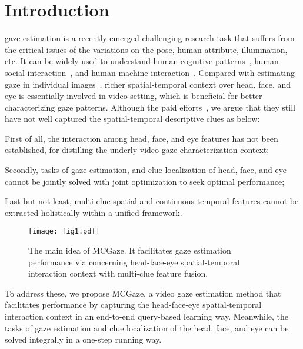 \documentclass[journal]{IEEEtran}
\begin{document}
\section{Introduction}
 gaze estimation is a recently emerged challenging research task that suffers from the critical issues of the variations on the pose, human attribute, illumination, etc.
It can be widely used to understand human cognitive patterns~\cite{henderson2003human, SPL_gaze_object_segment}, 
human social interaction~\cite{fan2018inferring, fan2019understanding, emery2000eyes}, 
and human-machine interaction~\cite{zhang2019evaluation}. Compared with estimating gaze in individual images~\cite{zhang2015appearance}, richer spatial-temporal context over head, face, and eye is essentially involved in video setting, which is beneficial for better characterizing gaze patterns.
Although the paid efforts~\cite{2eye_gaze,nonaka2022dynamic,bao2021adaptive,cheng2020coarse,tip_gaze}, we argue that they still have not well captured the spatial-temporal descriptive clues as below: 

 First of all, the interaction among head, face, and eye features has not been established, for distilling the underly video gaze characterization context;

 Secondly, tasks of gaze estimation, and clue localization of head, face, and eye cannot be jointly solved with joint optimization to seek optimal performance; 

 Last but not least, multi-clue spatial and continuous temporal features cannot be extracted holistically within a unified framework.

\begin{figure}[t]
\centerline{\texttt{[image: fig1.pdf]}}
\caption{The main idea of MCGaze. It facilitates gaze estimation performance via concerning head-face-eye spatial-temporal interaction context with multi-clue feature fusion.}
\label{fig:main_idea}
\vspace{-4mm}
\end{figure}

To address these, we propose MCGaze, a video gaze estimation method that facilitates performance by capturing the head-face-eye spatial-temporal interaction context in an end-to-end query-based learning way. Meanwhile, the tasks of gaze estimation and clue localization of the head, face, and eye can be solved integrally in a one-step running way.
\end{document}

